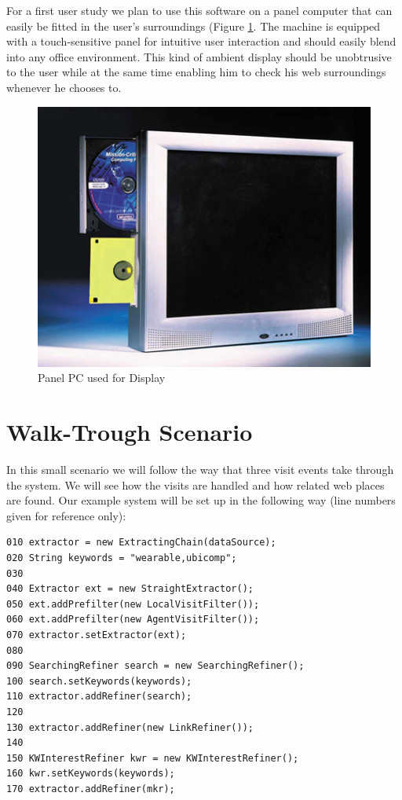 \documentclass[a4paper]{danarticle}
\theoremstyle{remark}
\begin{document}
      For a first user study we plan to use this software on a panel computer 
      that can easily be fitted in the user's surroundings (Figure \ref{ppc}. 
      The machine is 
      equipped with a touch-sensitive panel for intuitive user interaction and 
      should easily blend into any office environment. This kind of ambient 
      display should be unobtrusive to the user while at the same time enabling 
      him to check his web surroundings whenever he chooses to.
      \begin{figure}[ht]
        \centering
        \includegraphics[width=12cm]{ppc}
        \caption{Panel PC used for Display}
        \label{ppc}
      \end{figure}
  \section{Walk-Trough Scenario}
    In this small scenario we will follow the way that three visit events take    
    through the system. We will see how the visits are handled and how related 
    web places are found. Our example system will be set up in the following 
    way (line numbers given for reference only):
    \begin{verbatim}
010 extractor = new ExtractingChain(dataSource);
020 String keywords = "wearable,ubicomp";
030  
040 Extractor ext = new StraightExtractor();
050 ext.addPrefilter(new LocalVisitFilter());
060 ext.addPrefilter(new AgentVisitFilter());
070 extractor.setExtractor(ext);
080        
090 SearchingRefiner search = new SearchingRefiner();
100 search.setKeywords(keywords);
110 extractor.addRefiner(search);
120        
130 extractor.addRefiner(new LinkRefiner());
140                
150 KWInterestRefiner kwr = new KWInterestRefiner(); 
160 kwr.setKeywords(keywords); 
170 extractor.addRefiner(mkr); 
      \end{verbatim} 
      
\end{document}
